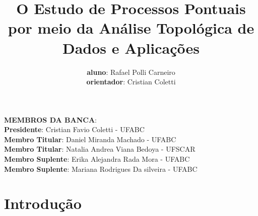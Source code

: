 \documentclass[11pt]{beamer}
\title{
    O Estudo de Processos Pontuais por meio da Análise
    Topológica de Dados e Aplica\c{c}\~oes}
\author{
    \textbf{aluno}: Rafael Polli Carneiro\\
    \textbf{orientador}: Cristian Coletti
}
\date{}
\theoremstyle{remark}
\theoremstyle{definition}
\theoremstyle{plain}
\begin{document}
    \begin{frame}
        \frametitle{}
        \maketitle

        \begin{flushleft}
            \small
            \textbf{MEMBROS DA BANCA}:\\
            \textbf{Presidente}:     Cristian Favio Coletti         - UFABC\\
            \textbf{Membro Titular}: Daniel Miranda Machado         - UFABC\\
            \textbf{Membro Titular}: Natalia Andrea Viana Bedoya    - UFSCAR\\
            \textbf{Membro Suplente}: Erika Alejandra Rada Mora     - UFABC\\
            \textbf{Membro Suplente}: Mariana Rodrigues Da silveira - UFABC
        \end{flushleft}
    \end{frame}

\section{Introdução}
    \begin{frame}

        \begin{figure}
        \end{figure}
    \end{frame}
\end{document}
